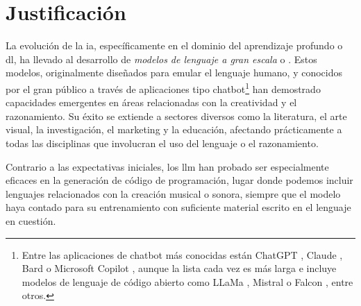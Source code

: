 \section{Justificación}



La evolución de la \gls{ia}, específicamente en el dominio del aprendizaje profundo o \gls{dl}, ha llevado al desarrollo de \emph{modelos de lenguaje a gran escala} o . Estos modelos, originalmente diseñados para emular el lenguaje humano, y conocidos por el gran público a través de aplicaciones tipo {chatbot}\footnote{Entre las aplicaciones de {chatbot} más conocidas están {ChatGPT} \citep{IntroducingChatGPT}, {Claude} \citep{IntroducingClaude}, {Bard} \citep{BardChatbot2024} o {Microsoft Copilot} \citep{mehdiAnnouncingMicrosoftCopilot2023}, aunque la lista cada vez es más larga e incluye modelos de lenguaje de código abierto como {LLaMa} \citep{touvronLLaMAOpenEfficient2023}, {Mistral} \citep{jiangMistral7B2023} o {Falcon} \citep{almazroueiFalconSeriesOpen2023}, entre otros.} han demostrado capacidades emergentes en áreas relacionadas con la creatividad y el razonamiento. Su éxito se extiende a sectores diversos como la literatura, el arte visual, la investigación, el marketing y la educación, afectando prácticamente a todas las disciplinas que involucran el uso del lenguaje o el razonamiento.

Contrario a las expectativas iniciales, los \gls{llm} han probado ser especialmente eficaces en la generación de código de programación, lugar donde podemos incluir lenguajes relacionados con la creación musical o sonora, siempre que el modelo haya contado para su entrenamiento con suficiente material escrito en el lenguaje en cuestión.


